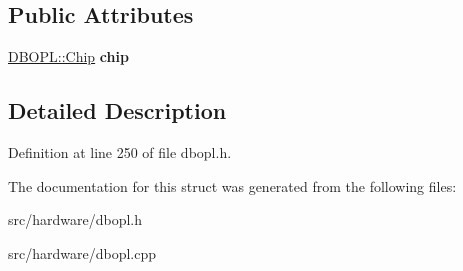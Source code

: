 \subsection*{Public Attributes}
\begin{DoxyCompactItemize}
\item 
\hypertarget{structDBOPL_1_1Handler_a5706eaa478a73368d63b806cea0d8e34}{\hyperlink{structDBOPL_1_1Chip}{D\-B\-O\-P\-L\-::\-Chip} {\bfseries chip}}\label{structDBOPL_1_1Handler_a5706eaa478a73368d63b806cea0d8e34}

\end{DoxyCompactItemize}


\subsection{Detailed Description}


Definition at line 250 of file dbopl.\-h.



The documentation for this struct was generated from the following files\-:\begin{DoxyCompactItemize}
\item 
src/hardware/dbopl.\-h\item 
src/hardware/dbopl.\-cpp\end{DoxyCompactItemize}
